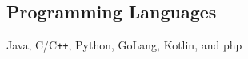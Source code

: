 \documentclass[../Resume.tex]{subfiles}
\begin{document}
    \subsection{Programming Languages}
    Java, C/C\verb!++!, Python, GoLang, Kotlin, and php
    \vspace*{-4mm}
\end{document}

